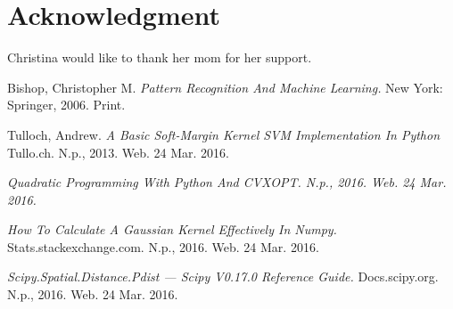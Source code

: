 \documentclass[journal]{IEEEtran}
\begin{document}
\section*{Acknowledgment}

Christina would like to thank her mom for her support.

\ifCLASSOPTIONcaptionsoff
  \newpage
\fi

\begin{thebibliography}{1}

  Bishop, Christopher M. \emph{Pattern Recognition And Machine Learning.} New York: Springer, 2006. Print.

  Tulloch, Andrew. \emph{A Basic Soft-Margin Kernel SVM Implementation In Python} Tullo.ch. N.p., 2013. Web. 24 Mar. 2016.

  \emph{Quadratic Programming With Python And CVXOPT. N.p., 2016. Web. 24 Mar. 2016.}

  \emph{How To Calculate A Gaussian Kernel Effectively In Numpy.} Stats.stackexchange.com. N.p., 2016. Web. 24 Mar. 2016.

  \emph{Scipy.Spatial.Distance.Pdist — Scipy V0.17.0 Reference Guide.} Docs.scipy.org. N.p., 2016. Web. 24 Mar. 2016.

\end{thebibliography}
\end{document}

